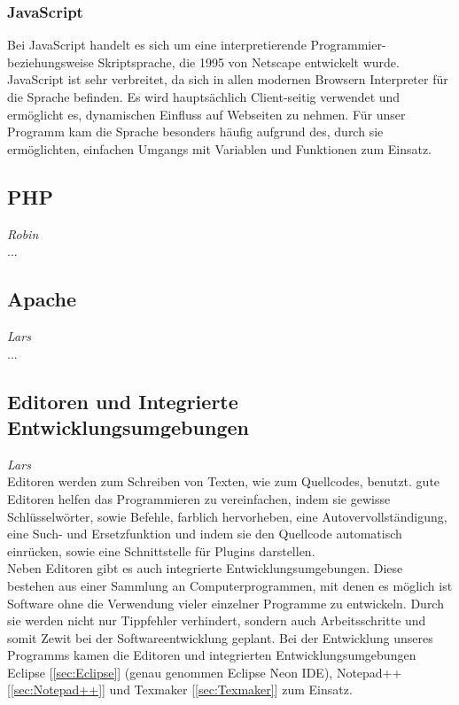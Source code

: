 \documentclass[12pt,a4paper,bibliography=totocnumbered,listof=totocnumbered]{scrartcl}
\begin{document}
\subsubsection{JavaScript}
\label{sec:JavaScript}
Bei JavaScript handelt es sich um eine interpretierende Programmier- beziehungsweise Skriptsprache, die 1995 von Netscape entwickelt wurde.\cite{JavaScript}\cite{wiki/JavaScript} JavaScript ist sehr verbreitet, da sich in allen modernen Browsern Interpreter für die Sprache befinden. Es wird hauptsächlich Client-seitig verwendet und ermöglicht es, dynamischen Einfluss auf Webseiten zu nehmen.\cite{JavaScript-JS} Für unser Programm kam die Sprache besonders häufig aufgrund des, durch sie ermöglichten, einfachen Umgangs mit Variablen und Funktionen zum Einsatz.

\subsection{PHP}
\label{sec:PHP}
\emph{Robin}\\
...

\subsection{Apache}
\emph{Lars}\\
...

\pagebreak
\subsection{Editoren und Integrierte Entwicklungsumgebungen}
\emph{Lars}\\
Editoren werden zum Schreiben von Texten, wie zum Quellcodes, benutzt. gute Editoren helfen das Programmieren zu vereinfachen, indem sie gewisse Schlüsselwörter, sowie Befehle, farblich hervorheben, eine Autovervollständigung, eine Such- und Ersetzfunktion und indem sie den Quellcode automatisch einrücken, sowie eine Schnittstelle für Plugins darstellen.\cite{Texteditor} \\
Neben Editoren gibt es auch integrierte Entwicklungsumgebungen. Diese bestehen aus einer Sammlung an Computerprogrammen, mit denen es möglich ist Software ohne die Verwendung vieler einzelner Programme zu entwickeln. Durch sie werden nicht nur Tippfehler verhindert, sondern auch Arbeitsschritte und somit Zewit bei der Softwareentwicklung geplant.\cite{Integrierte_Entwicklungsumgebung}\cite{Medienbruch}
Bei der Entwicklung unseres Programms kamen die Editoren und integrierten Entwicklungsumgebungen Eclipse [\ref{sec:Eclipse}] (genau genommen Eclipse Neon IDE), Notepad++ [\ref{sec:Notepad++}] und Texmaker [\ref{sec:Texmaker}] zum Einsatz.
\end{document}
